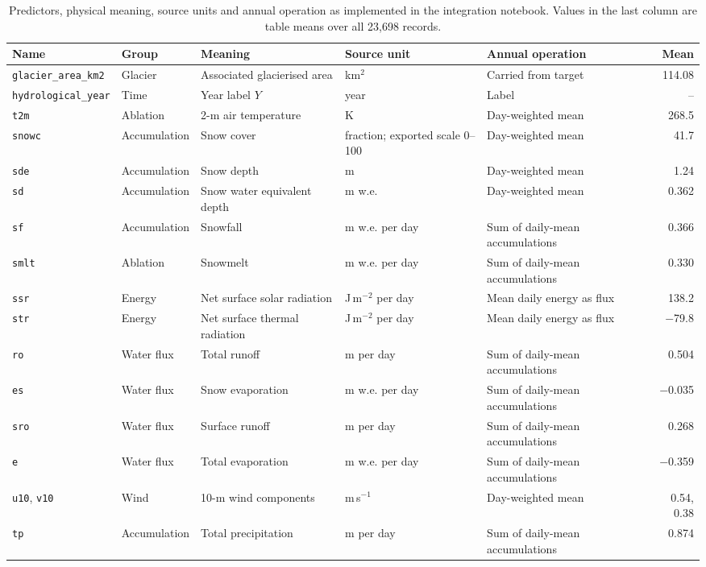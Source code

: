 \documentclass[conference]{IEEEtran}
\begin{document}
\begin{table}[t]
\caption{Predictors, physical meaning, source units and annual operation as implemented in the integration notebook. Values in the last column are table means over all 23,698 records.}
\label{tab:vars}
\centering
\footnotesize
\setlength{\tabcolsep}{3pt}
\begin{tabular}{llp{}p{}p{}r}
\toprule
Name & Group & Meaning & Source unit & Annual operation & Mean\\
\midrule
\texttt{glacier\_area\_km2} & Glacier & Associated glacierised area & km$^2$ & Carried from target & 114.08\\
\texttt{hydrological\_year} & Time & Year label $Y$ & year & Label & --\\
\texttt{t2m} & Ablation & 2-m air temperature & K & Day-weighted mean & 268.5\\
\texttt{snowc} & Accumulation & Snow cover & fraction; exported scale 0--100 & Day-weighted mean & 41.7\\
\texttt{sde} & Accumulation & Snow depth & m & Day-weighted mean & 1.24\\
\texttt{sd} & Accumulation & Snow water equivalent depth & m w.e. & Day-weighted mean & 0.362\\
\texttt{sf} & Accumulation & Snowfall & m w.e. per day & Sum of daily-mean accumulations & 0.366\\
\texttt{smlt} & Ablation & Snowmelt & m w.e. per day & Sum of daily-mean accumulations & 0.330\\
\texttt{ssr} & Energy & Net surface solar radiation & J\,m$^{-2}$ per day & Mean daily energy as flux & 138.2\\
\texttt{str} & Energy & Net surface thermal radiation & J\,m$^{-2}$ per day & Mean daily energy as flux & $-$79.8\\
\texttt{ro} & Water flux & Total runoff & m per day & Sum of daily-mean accumulations & 0.504\\
\texttt{es} & Water flux & Snow evaporation & m w.e. per day & Sum of daily-mean accumulations & $-$0.035\\
\texttt{sro} & Water flux & Surface runoff & m per day & Sum of daily-mean accumulations & 0.268\\
\texttt{e} & Water flux & Total evaporation & m w.e. per day & Sum of daily-mean accumulations & $-$0.359\\
\texttt{u10}, \texttt{v10} & Wind & 10-m wind components & m\,s$^{-1}$ & Day-weighted mean & 0.54, 0.38\\
\texttt{tp} & Accumulation & Total precipitation & m per day & Sum of daily-mean accumulations & 0.874\\
\bottomrule
\end{tabular}
\end{table}
\end{document}
